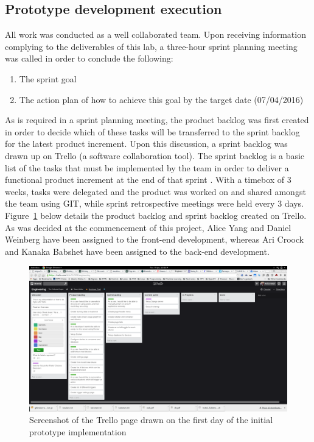 \documentclass[11pt, a4paper]{article}
\begin{document}
	\subsection{Prototype development execution}
	All work was conducted as a well collaborated team. Upon receiving information complying to the deliverables of this lab, a three-hour sprint planning meeting was called in order to conclude the following: 
	\begin{enumerate}
		\item The sprint goal
		\item The action plan of how to achieve this goal by the target date (07/04/2016)
	\end{enumerate}
	\noindent
	As is required in a sprint planning meeting, the product backlog was first created in order to decide which of these tasks will be transferred to the sprint backlog for the latest product increment. 
	Upon this discussion, a sprint backlog was drawn up on Trello (a software collaboration tool). The sprint backlog is a basic list of the tasks that must be implemented by the team in order to deliver a functional product increment at the end of that sprint \cite{sprintbacklogdef}. 
	\newline
	\newline
	\noindent
	With a timebox of 3 weeks, tasks were delegated and the product was worked on and shared amongst the team using GIT, while sprint retrospective meetings were held every 3 days. Figure~\ref{fig:init_backlogs} below details the product backlog and sprint backlog created on Trello.
	\newline
	\newline
	\noindent	
	As was decided at the commencement of this project, Alice Yang and Daniel Weinberg have been assigned to the front-end development, whereas Ari Croock and Kanaka Babshet have been assigned to the back-end development. 
	\newline
	
	\begin{figure}[htb]
		\centering
		\includegraphics[width=\linewidth]{init_backlogs}
		\caption{Screenshot of the Trello page drawn on the first day of the initial prototype implementation}
		\label{fig:init_backlogs}
	\end{figure}
\end{document}
